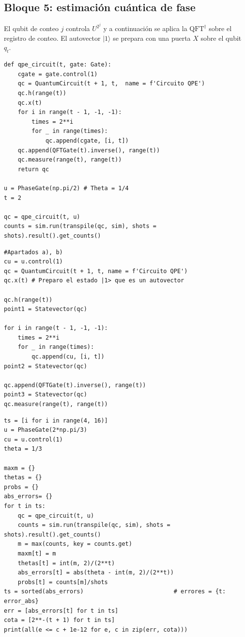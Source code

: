 \subsection{Bloque 5: estimación cuántica de fase}

El qubit de conteo $j$ controla $U^{2^j}$ y a continuación se aplica la $\mathrm{QFT}^\dagger$ sobre el registro de conteo. El autovector $|1\rangle$ se prepara con una puerta $X$ sobre el qubit $q_t$.

\begin{lstlisting}[caption={Circuito de QPE para una puerta de fase (ejercicios 5.1, 5.2 y 5.3).},label={lst:b5_qpe}]
def qpe_circuit(t, gate: Gate):
    cgate = gate.control(1)
    qc = QuantumCircuit(t + 1, t,  name = f'Circuito QPE')
    qc.h(range(t))
    qc.x(t)
    for i in range(t - 1, -1, -1):
        times = 2**i
        for _ in range(times):
            qc.append(cgate, [i, t])
    qc.append(QFTGate(t).inverse(), range(t))
    qc.measure(range(t), range(t))
    return qc

u = PhaseGate(np.pi/2) # Theta = 1/4
t = 2

qc = qpe_circuit(t, u)
counts = sim.run(transpile(qc, sim), shots = shots).result().get_counts()
\end{lstlisting}

\begin{lstlisting}[caption={Ejercicio E2.1: estados intermedios (puntos 1, 2 y 3) con \texttt{Statevector}.},label={lst:b5_e21}]
#Apartados a), b)
cu = u.control(1)
qc = QuantumCircuit(t + 1, t, name = f'Circuito QPE')
qc.x(t) # Preparo el estado |1> que es un autovector

qc.h(range(t))
point1 = Statevector(qc)

for i in range(t - 1, -1, -1):
    times = 2**i
    for _ in range(times):
        qc.append(cu, [i, t])
point2 = Statevector(qc)

qc.append(QFTGate(t).inverse(), range(t))
point3 = Statevector(qc)
qc.measure(range(t), range(t))
\end{lstlisting}

\begin{lstlisting}[caption={Ejercicio E2.2: estimación para $t=4,\dots,15$ y comprobación de la cota $2^{-(t+1)}$.},label={lst:b5_e22}]
ts = [i for i in range(4, 16)]
u = PhaseGate(2*np.pi/3)
cu = u.control(1)
theta = 1/3

maxm = {}
thetas = {}
probs = {}
abs_errors= {}
for t in ts: 
    qc = qpe_circuit(t, u)
    counts = sim.run(transpile(qc, sim), shots = shots).result().get_counts()
    m = max(counts, key = counts.get)
    maxm[t] = m
    thetas[t] = int(m, 2)/(2**t)
    abs_errors[t] = abs(theta - int(m, 2)/(2**t)) 
    probs[t] = counts[m]/shots
ts = sorted(abs_errors)                          # errores = {t: error_abs}
err = [abs_errors[t] for t in ts]
cota = [2**-(t + 1) for t in ts]
print(all(e <= c + 1e-12 for e, c in zip(err, cota)))
\end{lstlisting}

